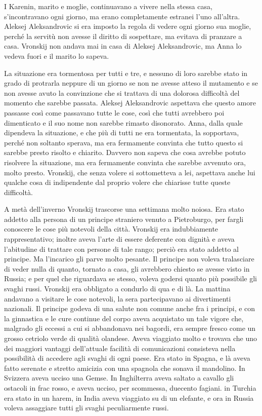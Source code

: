 \label{parte-quarta} 
\pagestyle{pagina}

I Karenin, marito e moglie, continuavano a vivere nella stessa casa, s'incontravano ogni giorno, ma erano completamente estranei l'uno all'altra. Aleksej Aleksandrovic si era imposto la regola di vedere ogni giorno sua moglie, perché la servitù non avesse il diritto di sospettare, ma evitava di pranzare a casa. Vronskij non andava mai in casa di Aleksej Aleksandrovic, ma Anna lo vedeva fuori e il marito lo sapeva. 

La situazione era tormentosa per tutti e tre, e nessuno di loro sarebbe stato in grado di protrarla neppure di un giorno se non ne avesse atteso il mutamento e se non avesse avuto la convinzione che si trattava di una dolorosa difficoltà del momento che sarebbe passata. Aleksej Aleksandrovic aspettava che questo amore passasse così come passavano tutte le cose, così che tutti avrebbero poi dimenticato e il suo nome non sarebbe rimasto disonorato. Anna, dalla quale dipendeva la situazione, e che più di tutti ne era tormentata, la sopportava, perché non soltanto sperava, ma era fermamente convinta che tutto questo si sarebbe presto risolto e chiarito. Davvero non sapeva che cosa avrebbe potuto risolvere la situazione, ma era fermamente convinta che sarebbe avvenuto ora, molto presto. Vronskij, che senza volere si sottometteva a lei, aspettava anche lui qualche cosa di indipendente dal proprio volere che chiarisse tutte queste difficoltà. 

A metà dell'inverno Vronskij trascorse una settimana molto noiosa. Era stato addetto alla persona di un principe straniero venuto a Pietroburgo, per fargli conoscere le cose più notevoli della città. Vronskij era indubbiamente rappresentativo; inoltre aveva l'arte di essere deferente con dignità e aveva l'abitudine di trattare con persone di tale rango; perciò era stato addetto al principe. Ma l'incarico gli parve molto pesante. Il principe non voleva tralasciare di veder nulla di quanto, tornato a casa, gli avrebbero chiesto se avesse visto in Russia; e per quel che riguardava se stesso, voleva godersi quanto più possibile gli svaghi russi. Vronskij era obbligato a condurlo di qua e di là. La mattina andavano a visitare le cose notevoli, la sera partecipavano ai divertimenti nazionali. Il principe godeva di una salute non comune anche fra i principi, e con la ginnastica e le cure continue del corpo aveva acquistato un tale vigore che, malgrado gli eccessi a cui si abbandonava nei bagordi, era sempre fresco come un grosso cetriolo verde di qualità olandese. Aveva viaggiato molto e trovava che uno dei maggiori vantaggi dell'attuale facilità di comunicazioni consisteva nella possibilità di accedere agli svaghi di ogni paese. Era stato in Spagna, e là aveva fatto serenate e stretto amicizia con una spagnola che sonava il mandolino. In Svizzera aveva ucciso una Gemse. In Inghilterra aveva saltato a cavallo gli ostacoli in frac rosso, e aveva ucciso, per scommessa, duecento fagiani. in Turchia era stato in un harem, in India aveva viaggiato su di un elefante, e ora in Russia voleva assaggiare tutti gli svaghi peculiarmente russi. 

